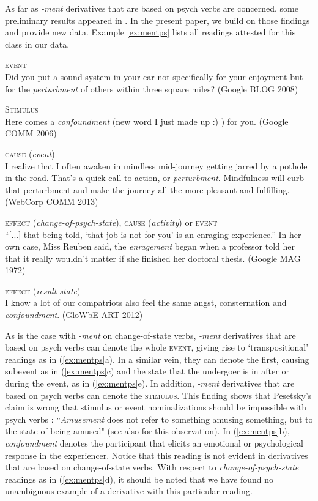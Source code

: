 \documentclass[output=paper]{langsci/langscibook}
\begin{document}
As far as \textit{-ment} derivatives that are based on psych verbs are concerned, some preliminary results appeared in \cite{Kawaletz.2015}. In the present paper, we build on those findings and provide new data. Example \ref{ex:mentps} lists all readings attested for this class in our data.

\begin{exe}
	\ex \label{ex:mentps}
	\begin{xlist}
		\ex \textsc{event} \\Did you put a sound system in your car not specifically for your enjoyment but for the \emph{perturbment} of others within three square miles? (Google BLOG 2008)

		\ex \textsc{Stimulus}\\ Here comes a \emph{confoundment} (new word I just made up :) ) for you. (Google COMM 2006)

		\ex \textsc{cause} (\textit{event}) \\I realize that I often awaken in mindless mid-journey getting jarred by a pothole in the road. That's a quick call-to-action, or \emph{perturbment}. Mindfulness will curb that perturbment and make the journey all the more pleasant and fulfilling. (WebCorp COMM 2013)

		\ex \textsc{effect} (\textit{change-of-psych-state}), \textsc{cause} (\textit{activity}) or \textsc{event}\\``[...] that being told, `that job is not for you' is an enraging experience.'' In her own case, Miss Reuben said, the \emph{enragement} began when a professor told her that it really wouldn't matter if she finished her doctoral thesis. (Google MAG 1972)

		\ex \textsc{effect} (\textit{result state})\\ I know a lot of our compatriots also feel the same angst, consternation and \emph{confoundment}. (GloWbE ART 2012)
	\end{xlist}
\end{exe}

As is the case with \textit{-ment} on change-of-state verbs, \textit{-ment} derivatives that are based on psych verbs can denote the whole \textsc{event}, giving rise to `transpositional' readings as in (\ref{ex:mentps}a). In a similar vein, they can denote the first, causing subevent as in (\ref{ex:mentps}c) and the state that the undergoer is in after or during the event, as in (\ref{ex:mentps}e). In addition, \textit{-ment} derivatives that are based on psych verbs can denote the \textsc{stimulus}. This finding shows that Pesetsky's claim is wrong that stimulus or event nominalizations should be impossible with psych verbs \citep[71]{Pesetsky.1995}: ``\textit{Amusement} does not refer to something amusing something, but to the state of being amused" (see also \citet{Kawaletz.2015} for this observation). In (\ref{ex:mentps}b), \textit{confoundment} denotes the participant that elicits an emotional or psychological response in the experiencer. Notice that this reading is not evident in derivatives that are based on change-of-state verbs. With respect to \textit{change-of-psych-state} readings as in  (\ref{ex:mentps}d), it should be noted that we have found no unambiguous example of a derivative with this particular reading.
\end{document}
